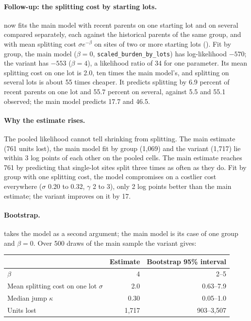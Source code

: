 \paragraph{Follow-up: the splitting cost by starting lots.}
 now fits the main model with recent parents on one
starting lot and on several compared separately, each against the historical
parents of the same group, and with mean splitting cost
$\sigma e^{-\beta}$ on sites of two or more starting lots
(). Fit by group, the main model
($\beta = 0$, \texttt{scaled\_burden\_by\_lots}) has log-likelihood $-570$; the
variant has $-553$ ($\beta = 4$), a likelihood ratio of 34 for one parameter.
Its mean splitting cost on one lot is 2.0, ten times the main model's, and
splitting on several lots is about 55 times cheaper. It predicts splitting by 6.9
percent of recent parents on one lot and 55.7 percent on several, against 5.5
and 55.1 observed; the main model predicts 17.7 and 46.5.

\paragraph{Why the estimate rises.} The pooled likelihood cannot tell shrinking
from splitting. The main estimate (761 units lost), the main model fit by group
(1,069) and the variant (1,717) lie within 3 log points of each other on the
pooled cells. The main estimate reaches 761 by predicting that single-lot sites
split three times as often as they do. Fit by group with one splitting cost,
the model compromises on a costlier cost everywhere ($\sigma$ 0.20 to 0.32,
$\gamma$ 2 to 3), only 2 log points better than the main estimate; the variant
improves on it by 17.

\paragraph{Bootstrap.}  takes the model as a
second argument; the main model is its case of one group and $\beta = 0$. Over
500 draws of the main sample the variant gives:

\begin{center}
\small
\begin{tabular}{lrr}
\hline
 & Estimate & Bootstrap 95\% interval \\
\hline
$\beta$ & 4 & 2--5 \\
Mean splitting cost on one lot $\sigma$ & 2.0 & 0.63--7.9 \\
Median jump $\kappa$ & 0.30 & 0.05--1.0 \\
Units lost & 1,717 & 903--3,507 \\
\hline
\end{tabular}
\end{center}

